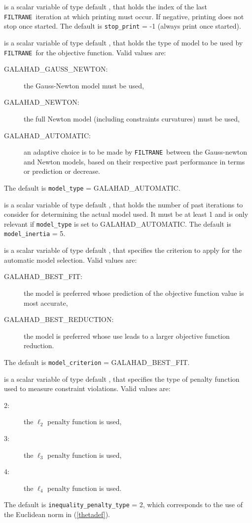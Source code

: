 \documentclass{galahad}
\newcommand{\packagename}{FILTRANE}
\newcommand{\sym}{\sf\small}
\newcommand{\filtrane}{{\tt \packagename}}
\begin{document}
\begin{description}
 is a scalar variable of type default \integer, that holds
the index of the last \filtrane\ iteration at which printing must occur. If
negative, printing does not stop once started.
The default is {\tt stop\_print} = -1 (always print once started).

 is a scalar variable of type default \integer, that holds
the type of model to be used by \filtrane\ for the objective function.  Valid
values are:
\begin{description}
\item[\sym GALAHAD\_GAUSS\_NEWTON:] the Gauss-Newton model must be used,
\item[\sym GALAHAD\_NEWTON:] the full Newton model (including constraints
curvatures) must be used,
\item[\sym GALAHAD\_AUTOMATIC:] an adaptive choice is to be made by
\filtrane\ between the Gauss-newton and Newton models, based on their
respective past performance in terms or prediction or decrease.
\end{description}
The default is {\tt model\_type} = {\sym GALAHAD\_AUTOMATIC}.

 is a scalar variable of type default \integer, that holds
the number of past iterations to consider for determining the actual model
used. It must be at least 1 and is only relevant if {\tt model\_type}
is set to {\sym GALAHAD\_AUTOMATIC}.
The default is {\tt model\_inertia} = 5.

 is a scalar variable of type default \integer, that
specifies the criterion to apply for the automatic model selection. Valid
values are:
\begin{description}
\item[\sym GALAHAD\_BEST\_FIT:] the model is preferred whose prediction of the
objective function value is most accurate,
\item[\sym GALAHAD\_BEST\_REDUCTION:] the model is preferred whose use leads
to a larger objective function reduction.
\end{description}
The default is {\tt model\_criterion} = {\sym GALAHAD\_BEST\_FIT}.

 is a scalar variable of type default \integer,
that specifies the type of penalty function used to measure constraint
violations.  Valid values are:
\begin{description}
\item[2:] the $\ell_2$ penalty function is used,
\item[3:] the $\ell_3$ penalty function is used,
\item[4:] the $\ell_4$ penalty function is used.
\end{description}
The default is {\tt inequality\_penalty\_type} = 2, which corresponds to the
use of the Euclidean norm in (\ref{thetadef}).


\end{description}
\end{document}

